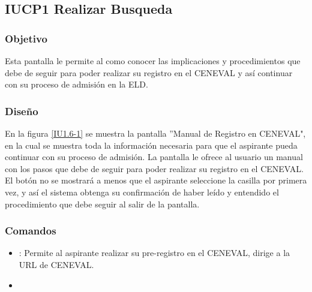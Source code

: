 \subsection{IUCP1 Realizar Busqueda}

\subsubsection{Objetivo}

Esta pantalla le permite al  como conocer las implicaciones y procedimientos que debe de seguir para poder realizar su registro en el CENEVAL y así continuar con su proceso de admisión en la ELD.


\subsubsection{Diseño}
En la figura \ref{IU1.6-1} se muestra la pantalla ''Manual de Registro en CENEVAL", en la cual se muestra toda la información necesaria para que el aspirante pueda continuar con su proceso de admisión. La pantalla le ofrece al usuario un manual con los pasos que debe de seguir para poder realizar su registro en el CENEVAL.
El botón  no se mostrará a menos que el aspirante seleccione la casilla  por primera vez, y así el sistema obtenga su confirmación de haber leído y entendido el procedimiento que debe seguir al salir de la pantalla. 



\subsubsection{Comandos}
\begin{itemize}
	\item {}: Permite al aspirante realizar su pre-registro en el CENEVAL, dirige a la URL de CENEVAL.
	\item 
\end{itemize}

